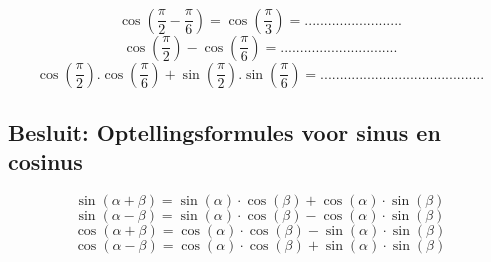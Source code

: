 \documentclass[a4paper,12pt]{article}
\begin{document}
\paragraph{}
\[\cos(\frac{\pi}{2} - \frac{\pi}{6})=\cos(\frac{\pi}{3})=.........................
\]
\[\cos(\frac{\pi}{2}) - \cos(\frac{\pi}{6})=..............................
\]
\[\cos(\frac{\pi}{2}).\cos(\frac{\pi}{6}) + \sin(\frac{\pi}{2}).\sin(\frac{\pi}{6})=..........................................
\]



\subsection{Besluit: Optellingsformules voor sinus en cosinus}

\textbf{\[\sin(\alpha + \beta)=\sin(\alpha)\cdot \cos(\beta)+\cos(\alpha)\cdot \sin(\beta)
\]
\[\sin(\alpha - \beta)=\sin(\alpha)\cdot \cos(\beta)-\cos(\alpha)\cdot \sin(\beta)
\]
\[\cos(\alpha + \beta)=\cos(\alpha)\cdot \cos(\beta)-\sin(\alpha)\cdot \sin(\beta)
\]
\[\cos(\alpha - \beta)=\cos(\alpha)\cdot \cos(\beta)+\sin(\alpha)\cdot \sin(\beta)
\]
}
\end{document}
